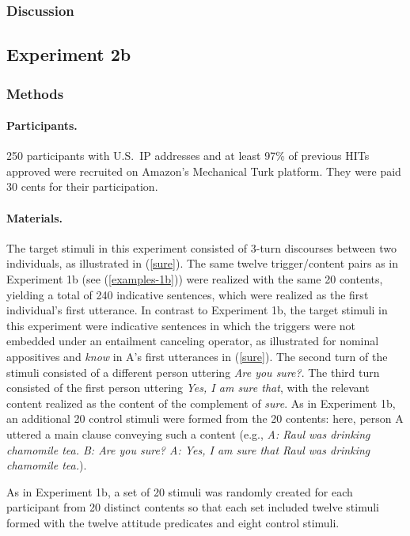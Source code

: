 \documentclass[11pt,fleqn]{article}
\newcommand{\6}{\mbox{$[\hspace*{-.6mm}[$}}
\newcommand{\9}{\mbox{$]\hspace*{-.6mm}]$}}
\begin{document}
\subsubsection{Discussion}

\subsection{Experiment 2b} 

\subsubsection{Methods}

\paragraph{Participants.} 250 participants with U.S.\ IP addresses and at least 97\% of previous HITs approved were recruited on Amazon's Mechanical Turk platform. They were paid 30 cents for their participation.

\paragraph{Materials.} The target stimuli in this experiment consisted of 3-turn discourses between two individuals, as illustrated in (\ref{sure}). The same twelve trigger/content pairs as in Experiment 1b (see (\ref{examples-1b})) were realized with the same 20 contents, yielding a total of 240 indicative sentences, which were realized as the first individual's first utterance. In contrast to Experiment 1b, the target stimuli in this experiment were indicative sentences in which the triggers were not embedded under an entailment canceling operator, as illustrated for nominal appositives and {\em know} in A's first utterances in (\ref{sure}). The second turn of the stimuli consisted of a different person uttering {\em Are you sure?}. The third turn consisted of the first person uttering {\em Yes, I am sure that}, with the relevant content realized as the content of the complement of {\em sure}. As in Experiment 1b, an additional 20 control stimuli were formed from the 20 contents: here, person A uttered a main clause conveying such a content (e.g., {\em A: Raul was drinking chamomile tea. B: Are you sure? A: Yes, I am sure that Raul was drinking chamomile tea.}).

As in Experiment 1b, a set of 20 stimuli was randomly created for each participant from 20 distinct contents so that each set included twelve stimuli formed with the twelve attitude predicates and eight control stimuli.
\end{document}
